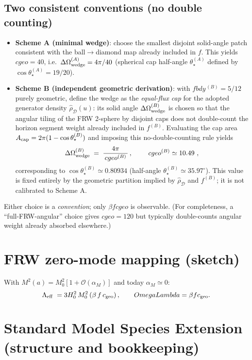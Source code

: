 \documentclass[aps,prd,onecolumn,superscriptaddress,nofootinbib]{revtex4-2}
\def\OmL{OmegaLambda}%
\def\cgeo{cgeo}%
\def\fbdy{fbdy}%
\def\boxed#1{#1}%
\newcommand{\OmL}{\Omega_\Lambda}
\newcommand{\cgeo}{c_{\rm geo}}
\newcommand{\fbdy}{f_{\rm bdy}}
\begin{document}
\subsection{Two consistent conventions (no double counting)}
\label{sec:cgeo-choices}
\begin{itemize}[leftmargin=1.3em]
\item \textbf{Scheme A (minimal wedge)}: choose the smallest disjoint solid-angle patch consistent with the ball\(\to\)diamond map already included in \(f\). This yields \(\boxed{\cgeo=40}\), i.e.\ \(\Delta\Omega_{\rm wedge}^{(A)}=4\pi/40\) (spherical cap half-angle \(\theta_\star^{(A)}\) defined by \(\cos\theta_\star^{(A)}=19/20\)).
\item \textbf{Scheme B (independent geometric derivation)}: with \(\fbdy^{\,(B)}=5/12\) purely geometric, define the wedge as the \emph{equal-flux cap} for the adopted generator density \(\hat\rho_{\mathcal D}(u)\): its solid angle \(\Delta\Omega_{\rm wedge}^{(B)}\) is chosen so that the angular tiling of the FRW 2-sphere by disjoint caps does not double-count the horizon segment weight already included in \(f^{(B)}\). Evaluating the cap area \(A_{\rm cap}=2\pi(1-\cos\theta_\star^{(B)})\) and imposing this no-double-counting rule yields
\[
\Delta\Omega_{\rm wedge}^{(B)} \;=\; \frac{4\pi}{\,\cgeo^{(B)}\,}\,,\qquad
\boxed{\ \cgeo^{(B)} \simeq 10.49\ },
\]
corresponding to \(\cos\theta_\star^{(B)}\simeq 0.80934\) (half-angle \(\theta_\star^{(B)}\simeq 35.97^\circ\)). This value is fixed entirely by the geometric partition implied by \(\hat\rho_{\mathcal D}\) and \(f^{(B)}\); it is not calibrated to Scheme A.
\end{itemize}
Either choice is a \emph{convention}; only \(\beta f \cgeo\) is observable. (For completeness, a “full-FRW-angular” choice gives \(\cgeo=120\) but typically double-counts angular weight already absorbed elsewhere.)

\section{FRW zero-mode mapping (sketch)}
\label{app:frw-mapping}
With \(M^2(a)=M_0^2[1+\mathcal O(\alpha_M)]\) and today \(\alpha_M\!\simeq\!0\):
\begin{equation}
\Lambda_{\rm eff} \;= 3 H_0^2 \,M_0^2 \,(\beta\, f\, c_{\rm geo})\,,\qquad
\OmL=\beta f c_{\rm geo}.
\end{equation}

\section{Standard Model Species Extension (structure and bookkeeping)}
\label{app:SM}
\end{document}
